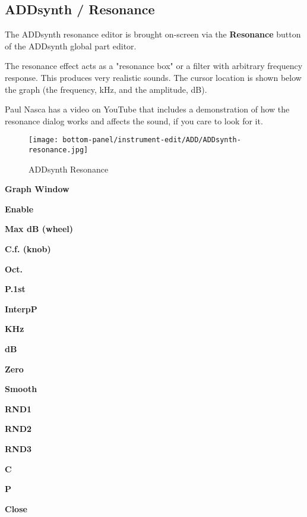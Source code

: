 \subsection{ADDsynth / Resonance}
\label{subsec:addsynth_resonance}

   The ADDsynth resonance editor is brought on-screen via the
   \textbf{Resonance} button of the ADDsynth global part editor.

   The resonance effect acts as a "resonance box" or a filter with arbitrary
   frequency response. This produces very realistic sounds. 
   The cursor location is shown below the graph (the frequency, kHz, and
   the amplitude, dB). 

   Paul Nasca has a video on YouTube that includes a demonstration of how
   the resonance dialog works and affects the sound, if you care to look for
   it.

\begin{figure}[H]
   \centering 
   \texttt{[image: bottom-panel/instrument-edit/ADD/ADDsynth-resonance.jpg]}
   \caption{ADDsynth Resonance}
   \label{fig:addsynth_resonance}
\end{figure}

   \begin{enumber}
      \item \textbf{Graph Window}
      \item \textbf{Enable}
      \item \textbf{Max dB (wheel)}
      \item \textbf{C.f. (knob)}
      \item \textbf{Oct.}
      \item \textbf{P.1st}
      \item \textbf{InterpP}
      \item \textbf{KHz}
      \item \textbf{dB}
      \item \textbf{Zero}
      \item \textbf{Smooth}
      \item \textbf{RND1}
      \item \textbf{RND2}
      \item \textbf{RND3}
      \item \textbf{C}
      \item \textbf{P}
      \item \textbf{Close}
   \end{enumber}

   \setcounter{ItemCounter}{0}      %

